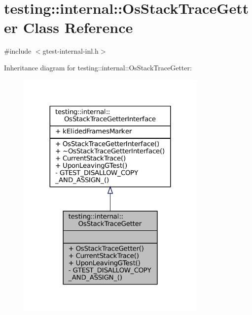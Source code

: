 \hypertarget{classtesting_1_1internal_1_1OsStackTraceGetter}{}\section{testing\+:\+:internal\+:\+:Os\+Stack\+Trace\+Getter Class Reference}
\label{classtesting_1_1internal_1_1OsStackTraceGetter}


{\ttfamily \#include $<$gtest-\/internal-\/inl.\+h$>$}



Inheritance diagram for testing\+:\+:internal\+:\+:Os\+Stack\+Trace\+Getter\+:
\nopagebreak
\begin{figure}[H]
\begin{center}
\leavevmode
\includegraphics[width=263pt]{classtesting_1_1internal_1_1OsStackTraceGetter__inherit__graph}
\end{center}
\end{figure}



